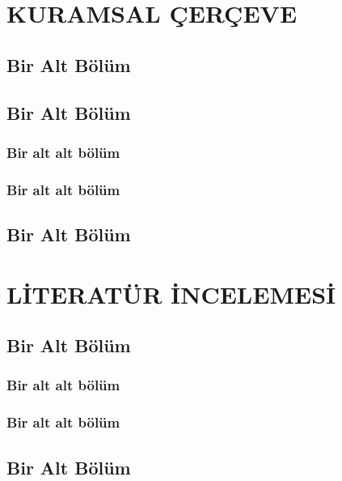 \documentclass[
oneside, %
doktora, %
]{aufbetez} %
\begin{document}
\chapter{KURAMSAL ÇERÇEVE}
\lipsum

\section{Bir Alt Bölüm}
\lipsum

\section{Bir Alt Bölüm}
\lipsum

\subsection{Bir alt alt bölüm}
\lipsum

\subsection{Bir alt alt bölüm}
\lipsum

\section{Bir Alt Bölüm}
\lipsum

\chapter{LİTERATÜR İNCELEMESİ}
\lipsum

\section{Bir Alt Bölüm}
\lipsum

\subsection{Bir alt alt bölüm}
\lipsum

\subsection{Bir alt alt bölüm}
\lipsum

\section{Bir Alt Bölüm}
\lipsum
\end{document}
